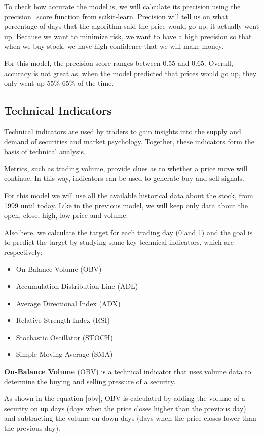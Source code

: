 \documentclass[conference,compsoc]{IEEEtran}
\begin{document}
To check how accurate the model is, we will calculate its precision using the precision\_score function from scikit-learn.
%
Precision will tell us on what percentage of days that the algorithm said the price would go up, it actually went up. 
%
Because we want to minimize risk, we want to have a high precision so that when we buy stock, we have high confidence that we will make money.

For this model, the precision score ranges between 0.55 and 0.65.
%
Overall, accuracy is not great as, when the model predicted that prices would go up, they only went up 55\%-65\% of the time.

\subsection*{Technical Indicators}
Technical indicators are used by traders to gain insights into the supply and demand of securities and market psychology.
%
Together, these indicators form the basis of technical analysis. 

Metrics, such as trading volume, provide clues as to whether a price move will continue. 
%
In this way, indicators can be used to generate buy and sell signals.

For this model we will use all the available historical data about the stock, from 1999 until today.
%
Like in the previous model, we will keep only data about the open, close, high, low price and volume.

Also here, we calculate the target for each trading day (0 and 1) and the goal is to predict the target by studying some key technical indicators, which are respectively:

\begin{itemize}
    \item On Balance Volume (OBV)
    \item Accumulation Distribution Line (ADL)
    \item Average Directional Index (ADX)
    \item Relative Strength Index (RSI)
    \item Stochastic Oscillator (STOCH)
    \item Simple Moving Average (SMA)
\end{itemize}

\textbf{On-Balance Volume} (OBV) is a technical indicator that uses volume data to determine the buying and selling pressure of a security. 

As shown in the equation \ref{obv}, OBV is calculated by adding the volume of a security on up days (days when the price closes higher than the previous day) and subtracting the volume on down days (days when the price closes lower than the previous day).
\end{document}
